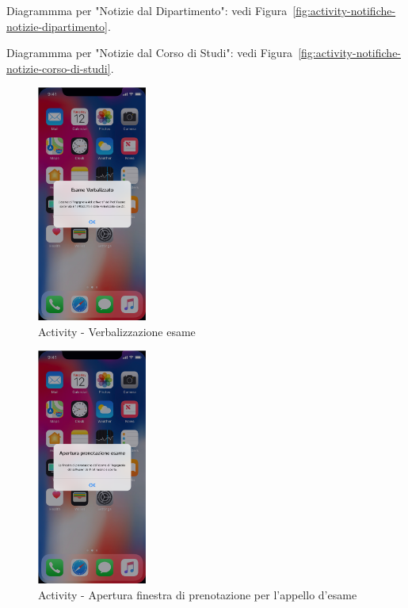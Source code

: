 Diagrammma per "Notizie dal Dipartimento": vedi Figura~\vref{fig:activity-notifiche-notizie-dipartimento}.

Diagrammma per "Notizie dal Corso di Studi": vedi Figura~\vref{fig:activity-notifiche-notizie-corso-di-studi}.

\begin{figure}
	\centering
	\includegraphics[width=0.32\textwidth]{imgs/gruppo2/activity-notifiche-verbalizzazione-esame}
	\caption{Activity - Verbalizzazione esame}
	\label{fig:activity-notifiche-verbalizzazione-esame}
\end{figure}

\begin{figure}
	\centering
	\includegraphics[width=0.32\textwidth]{imgs/gruppo2/activity-notifiche-apertura-prenotazione-esame}
	\caption{Activity - Apertura finestra di prenotazione per l'appello d'esame}
	\label{fig:activity-notifiche-apertura-finestra-esame}
\end{figure}

